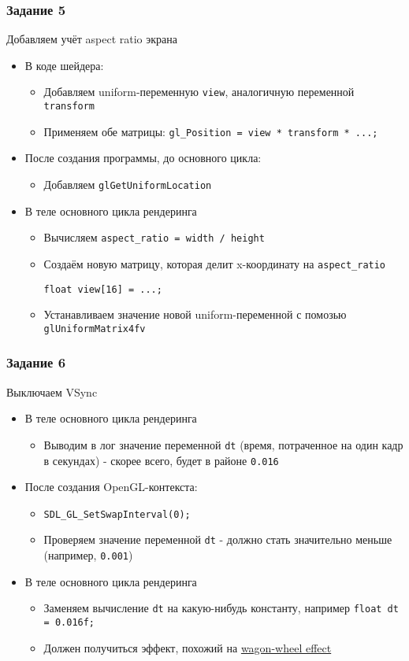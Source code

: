 \documentclass{beamer}
\begin{document}
\begin{frame}[fragile]
\frametitle{Задание 5}
Добавляем учёт aspect ratio экрана
\begin{itemize}
\pause
\item В коде шейдера:
\begin{itemize}
\item Добавляем uniform-переменную \verb|view|, аналогичную переменной \verb|transform|
\pause 
\item Применяем обе матрицы: \verb|gl_Position = view * transform * ...;|
\end{itemize}
\pause
\item После создания программы, до основного цикла:
\begin{itemize}
\item Добавляем \verb|glGetUniformLocation|
\end{itemize}
\pause
\item В теле основного цикла рендеринга
\begin{itemize}
\item Вычисляем \verb|aspect_ratio = width / height|
\pause
\item Создаём новую матрицу, которая делит x-координату на \verb|aspect_ratio|
\begin{verbatim}
float view[16] = ...;
\end{verbatim}
\pause
\item Устанавливаем значение новой uniform-переменной с помозью \verb|glUniformMatrix4fv|
\end{itemize}
\end{itemize}
\end{frame}

\begin{frame}[fragile]
\frametitle{Задание 6}
Выключаем VSync
\begin{itemize}
\pause
\item В теле основного цикла рендеринга
\begin{itemize}
\item Выводим в лог значение переменной \verb|dt| (время, потраченное на один кадр в секундах) - скорее всего, будет в районе \verb|0.016|
\end{itemize}
\pause
\item После создания OpenGL-контекста:
\begin{itemize}
\item \verb|SDL_GL_SetSwapInterval(0);|
\pause
\item Проверяем значение переменной \verb|dt| - должно стать значительно меньше (например, \verb|0.001|)
\end{itemize}
\pause
\item В теле основного цикла рендеринга
\begin{itemize}
\item Заменяем вычисление \verb|dt| на какую-нибудь константу, например \verb|float dt = 0.016f;|
\item Должен получиться эффект, похожий на \href{https://en.wikipedia.org/wiki/Wagon-wheel_effect}{wagon-wheel effect}
\end{itemize}
\end{itemize}
\end{frame}
\end{document}
